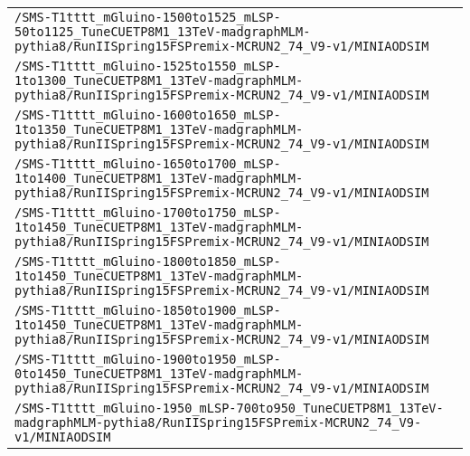 \begin{center}
\begin{tabular}{l}
\verb!/SMS-T1tttt_mGluino-1500to1525_mLSP-50to1125_TuneCUETP8M1_13TeV-madgraphMLM-pythia8/RunIISpring15FSPremix-MCRUN2_74_V9-v1/MINIAODSIM! \tabularnewline
\verb!/SMS-T1tttt_mGluino-1525to1550_mLSP-1to1300_TuneCUETP8M1_13TeV-madgraphMLM-pythia8/RunIISpring15FSPremix-MCRUN2_74_V9-v1/MINIAODSIM! \tabularnewline
\verb!/SMS-T1tttt_mGluino-1600to1650_mLSP-1to1350_TuneCUETP8M1_13TeV-madgraphMLM-pythia8/RunIISpring15FSPremix-MCRUN2_74_V9-v1/MINIAODSIM! \tabularnewline
\verb!/SMS-T1tttt_mGluino-1650to1700_mLSP-1to1400_TuneCUETP8M1_13TeV-madgraphMLM-pythia8/RunIISpring15FSPremix-MCRUN2_74_V9-v1/MINIAODSIM! \tabularnewline
\verb!/SMS-T1tttt_mGluino-1700to1750_mLSP-1to1450_TuneCUETP8M1_13TeV-madgraphMLM-pythia8/RunIISpring15FSPremix-MCRUN2_74_V9-v1/MINIAODSIM! \tabularnewline
\verb!/SMS-T1tttt_mGluino-1800to1850_mLSP-1to1450_TuneCUETP8M1_13TeV-madgraphMLM-pythia8/RunIISpring15FSPremix-MCRUN2_74_V9-v1/MINIAODSIM! \tabularnewline
\verb!/SMS-T1tttt_mGluino-1850to1900_mLSP-1to1450_TuneCUETP8M1_13TeV-madgraphMLM-pythia8/RunIISpring15FSPremix-MCRUN2_74_V9-v1/MINIAODSIM! \tabularnewline
\verb!/SMS-T1tttt_mGluino-1900to1950_mLSP-0to1450_TuneCUETP8M1_13TeV-madgraphMLM-pythia8/RunIISpring15FSPremix-MCRUN2_74_V9-v1/MINIAODSIM! \tabularnewline
\verb!/SMS-T1tttt_mGluino-1950_mLSP-700to950_TuneCUETP8M1_13TeV-madgraphMLM-pythia8/RunIISpring15FSPremix-MCRUN2_74_V9-v1/MINIAODSIM! \tabularnewline
\hline
\end{tabular}\end{center}
